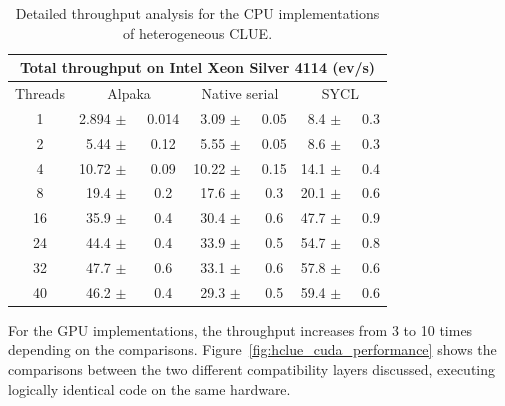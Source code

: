 \begin{table}[htb]
    \centering
    \begin{tabular}{|c|r@{}c|r@{}c|r@{}c|}
 \hline
 \multicolumn{7}{|c|}{Total throughput on Intel Xeon Silver 4114 (ev/s)} \\
 \hline
 Threads & \multicolumn{2}{c|}{Alpaka} & \multicolumn{2}{c|}{Native serial} & \multicolumn{2}{c|}{SYCL}\\
 \hline
 1 & 2.894 $\pm$& ~0.014 & 3.09 $\pm$&  ~0.05 & 8.4 $\pm$&  ~0.3 \\
 2 & 5.44 $\pm$& ~0.12 & 5.55 $\pm$& ~0.05 & 8.6 $\pm$& ~0.3 \\
 4 & 10.72 $\pm$& ~0.09 &	10.22 $\pm$& ~0.15 & 14.1 $\pm$& ~0.4 \\
 8 & 19.4 $\pm$& ~0.2 & 17.6 $\pm$& ~0.3 & 20.1 $\pm$& ~0.6 \\
 16 & 35.9 $\pm$& ~0.4 & 30.4 $\pm$& ~0.6 & 47.7 $\pm$& ~0.9 \\
 24	& 44.4 $\pm$& ~0.4 & 33.9 $\pm$& ~0.5 & 54.7 $\pm$& ~0.8 \\
 32	& 47.7 $\pm$& ~0.6 & 33.1 $\pm$& ~0.6 & 57.8 $\pm$& ~0.6 \\
 40	& 46.2 $\pm$& ~0.4	& 29.3 $\pm$& ~0.5	& 59.4 $\pm$& ~0.6 \\
 \hline
\end{tabular}
    \caption{Detailed throughput analysis for the CPU implementations of heterogeneous CLUE.}
    \label{tab:hclue_cpu_performance}
\end{table}

For the GPU implementations, the throughput increases from 3 to 10 times depending on the comparisons. Figure~\ref{fig:hclue_cuda_performance} shows the comparisons between the two different compatibility layers discussed, executing logically identical code on the same hardware.

